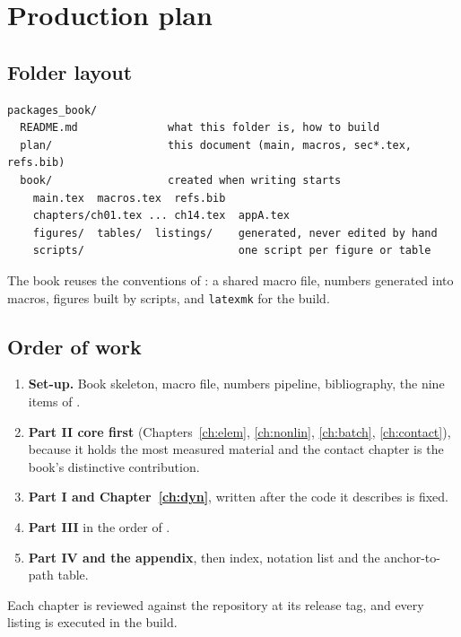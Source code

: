 \section{Production plan}\label{sec:production}

\subsection{Folder layout}
\begin{verbatim}
packages_book/
  README.md              what this folder is, how to build
  plan/                  this document (main, macros, sec*.tex, refs.bib)
  book/                  created when writing starts
    main.tex  macros.tex  refs.bib
    chapters/ch01.tex ... ch14.tex  appA.tex
    figures/  tables/  listings/    generated, never edited by hand
    scripts/                        one script per figure or table
\end{verbatim}
The book reuses the conventions of : a shared macro file, numbers generated into macros, figures built by scripts, and \texttt{latexmk} for the build.

\subsection{Order of work}
\begin{enumerate}
\item \textbf{Set-up.} Book skeleton, macro file, numbers pipeline, bibliography, the nine items of .
\item \textbf{Part II core first} (Chapters~\ref{ch:elem}, \ref{ch:nonlin}, \ref{ch:batch}, \ref{ch:contact}), because it holds the most measured material and the contact chapter is the book's distinctive contribution.
\item \textbf{Part I and Chapter~\ref{ch:dyn}}, written after the code it describes is fixed.
\item \textbf{Part III} in the order of .
\item \textbf{Part IV and the appendix}, then index, notation list and the anchor-to-path table.
\end{enumerate}
Each chapter is reviewed against the repository at its release tag, and every listing is executed in the build.

